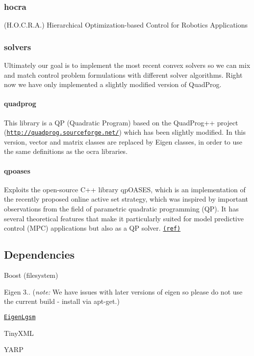 \subsubsection*{hocra}

(H.\+O.\+C.\+R.\+A.) Hierarchical Optimization-\/based Control for Robotics Applications

\subsubsection*{solvers}

Ultimately our goal is to implement the most recent convex solvers so we can mix and match control problem formulations with different solver algorithms. Right now we have only implemented a slightly modified version of Quad\+Prog.

\paragraph*{quadprog}

This library is a QP (Quadratic Program) based on the Quad\+Prog++ project (\href{http://quadprog.sourceforge.net/}{\tt http\+://quadprog.\+sourceforge.\+net/}) which has been slightly modified. In this version, vector and matrix classes are replaced by Eigen classes, in order to use the same definitions as the ocra libraries.

\paragraph*{qpoases}

Exploits the open-\/source C++ library qp\+O\+A\+S\+ES, which is an implementation of the recently proposed online active set strategy, which was inspired by important observations from the field of parametric quadratic programming (QP). It has several theoretical features that make it particularly suited for model predictive control (M\+PC) applications but also as a QP solver. \href{https://projects.coin-or.org/qpOASES}{\tt (ref)}

\subsection*{Dependencies}


\begin{DoxyItemize}
\item Boost ({\ttfamily filesystem})
\item Eigen 3.. ({\itshape note\+:} We have issues with later versions of eigen so please do not use the current build -\/ install via apt-\/get.)
\item \href{https://github.com/ocra-recipes/eigen_lgsm}{\tt Eigen\+Lgsm}
\item Tiny\+X\+ML
\item Y\+A\+RP
\end{DoxyItemize}

